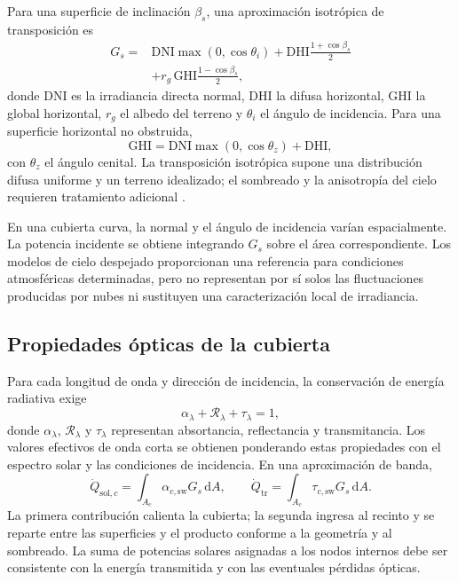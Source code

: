 Para una superficie de inclinación $\beta_s$, una aproximación isotrópica de transposición es
\begin{equation}
\begin{aligned}
G_s={}&\mathrm{DNI}\max(0,\cos\theta_i)
+\mathrm{DHI}\frac{1+\cos\beta_s}{2}\\
&+r_g\,\mathrm{GHI}\frac{1-\cos\beta_s}{2},
\end{aligned}
\label{eq:globalirradiance}
\end{equation}
donde DNI es la irradiancia directa normal, DHI la difusa horizontal, GHI la global horizontal, $r_g$ el albedo del terreno y $\theta_i$ el ángulo de incidencia. Para una superficie horizontal no obstruida,
\begin{equation}
\mathrm{GHI}=\mathrm{DNI}\max(0,\cos\theta_z)+\mathrm{DHI},
\label{eq:ghi}
\end{equation}
con $\theta_z$ el ángulo cenital. La transposición isotrópica supone una distribución difusa uniforme y un terreno idealizado; el sombreado y la anisotropía del cielo requieren tratamiento adicional \cite{duffie2013}.

En una cubierta curva, la normal y el ángulo de incidencia varían espacialmente. La potencia incidente se obtiene integrando $G_s$ sobre el área correspondiente. Los modelos de cielo despejado proporcionan una referencia para condiciones atmosféricas determinadas, pero no representan por sí solos las fluctuaciones producidas por nubes ni sustituyen una caracterización local de irradiancia.

\subsection{Propiedades ópticas de la cubierta}

Para cada longitud de onda y dirección de incidencia, la conservación de energía radiativa exige
\begin{equation}
\alpha_\lambda+\mathcal R_\lambda+\tau_\lambda=1,
\label{eq:radiativebalance}
\end{equation}
donde $\alpha_\lambda$, $\mathcal R_\lambda$ y $\tau_\lambda$ representan absortancia, reflectancia y transmitancia. Los valores efectivos de onda corta se obtienen ponderando estas propiedades con el espectro solar y las condiciones de incidencia. En una aproximación de banda,
\begin{equation}
\dot Q_{\mathrm{sol},c}=\int_{A_c}\alpha_{c,\mathrm{sw}}G_s\,\mathrm{d}A,
\qquad
\dot Q_{\mathrm{tr}}=\int_{A_c}\tau_{c,\mathrm{sw}}G_s\,\mathrm{d}A.
\label{eq:potencia_solar_cubierta}
\end{equation}
La primera contribución calienta la cubierta; la segunda ingresa al recinto y se reparte entre las superficies y el producto conforme a la geometría y al sombreado. La suma de potencias solares asignadas a los nodos internos debe ser consistente con la energía transmitida y con las eventuales pérdidas ópticas.

